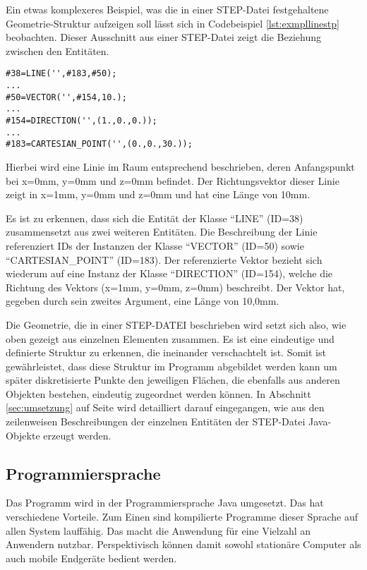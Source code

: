 Ein etwas komplexeres Beispiel, was die in einer STEP-Datei festgehaltene Geometrie-Struktur aufzeigen soll lässt sich in Codebeispiel \ref{lst:exmpllinestp} beobachten. Dieser Ausschnitt aus einer STEP-Datei zeigt die Beziehung zwischen den Entitäten. 


\begin{lstlisting}[captionpos=b, style=customc, caption=Beschreibung einer Linie in STEP, label=lst:exmpllinestp]
#38=LINE('',#183,#50);
...
#50=VECTOR('',#154,10.);
...
#154=DIRECTION('',(1.,0.,0.));
...
#183=CARTESIAN_POINT('',(0.,0.,30.));
\end{lstlisting} 

Hierbei wird eine Linie im Raum entsprechend beschrieben, deren Anfangspunkt bei x=0mm, y=0mm und z=0mm befindet. Der Richtungsvektor dieser Linie zeigt in x=1mm, y=0mm und z=0mm und hat eine Länge von 10mm.

Es ist zu erkennen, dass sich die Entität der Klasse "`LINE"' (ID=38) zusammensetzt aus zwei weiteren Entitäten. Die Beschreibung der Linie referenziert IDs der Instanzen der Klasse "`VECTOR"' (ID=50) sowie "`CARTESIAN\_POINT"' (ID=183). Der referenzierte Vektor bezieht sich wiederum auf eine Instanz der Klasse "`DIRECTION"' (ID=154), welche die Richtung des Vektors (x=1mm, y=0mm, z=0mm) beschreibt. Der Vektor hat, gegeben durch sein zweites Argument, eine Länge von 10,0mm.

Die Geometrie, die in einer STEP-DATEI beschrieben wird setzt sich also, wie oben gezeigt aus einzelnen Elementen zusammen. Es ist eine eindeutige und definierte Struktur zu erkennen, die ineinander verschachtelt ist. Somit ist gewährleistet, dass diese Struktur im Programm abgebildet werden kann um später diskretisierte Punkte den jeweiligen Flächen, die ebenfalls aus anderen Objekten bestehen, eindeutig zugeordnet werden können. 
In Abschnitt \ref{sec:umsetzung} auf Seite \pageref{sec:umsetzung} wird detailliert darauf eingegangen, wie aus den zeilenweisen Beschreibungen der einzelnen Entitäten der STEP-Datei Java-Objekte erzeugt werden.              

\subsection{Programmiersprache} 
 
Das Programm wird in der Programmiersprache Java umgesetzt. Das hat verschiedene Vorteile. Zum Einen sind kompilierte Programme dieser Sprache auf allen System lauffähig. Das macht die Anwendung für eine Vielzahl an Anwendern nutzbar. Perspektivisch können damit sowohl stationäre Computer als auch mobile Endgeräte bedient werden.

